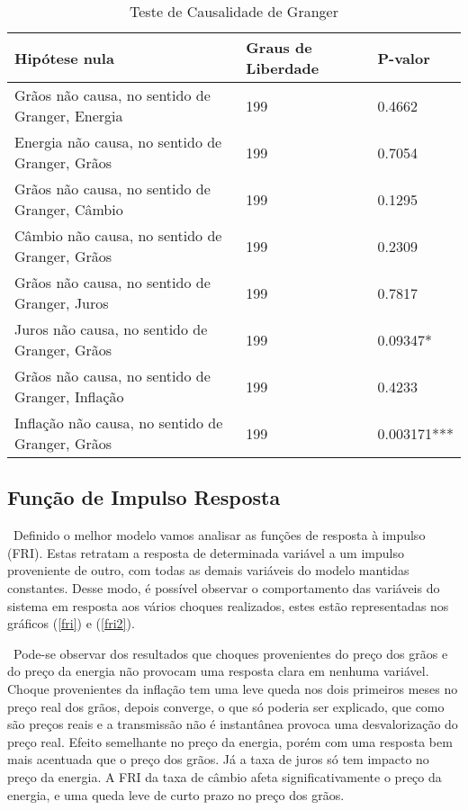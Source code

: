 \documentclass[a4paper,12pt,oneside,titlepage]{article}
\begin{document}
 
\begin{table}[H]
	\caption{Teste de Causalidade de Granger}
	\label{granger}
	\begin{center}
		\begin{tabular}{lll}
			\hline
			Hipótese nula& Graus de Liberdade& P-valor\\ 
			\hline
			Grãos não causa, no sentido de Granger, Energia& 199& 0.4662\\
			Energia não causa, no sentido de Granger, Grãos& 199& 0.7054\\
			Grãos não causa, no sentido de Granger, Câmbio& 199& 0.1295\\
			Câmbio não causa, no sentido de Granger, Grãos& 199& 0.2309\\
			Grãos não causa, no sentido de Granger, Juros& 199& 0.7817\\
			Juros não causa, no sentido de Granger, Grãos& 199& 0.09347*\\
			Grãos não causa, no sentido de Granger, Inflação& 199& 0.4233\\
			Inflação não causa, no sentido de Granger, Grãos& 199& 0.003171***\\
			\hline
		\end{tabular}
	\end{center}
\end{table}
 


  
\subsection{Função de Impulso Resposta}
 
\ Definido o melhor modelo vamos analisar as funções de resposta à impulso (FRI). Estas retratam a resposta de determinada variável a um impulso proveniente de outro, com
todas as demais variáveis do modelo mantidas constantes. Desse modo, é possível observar o comportamento das variáveis do sistema em resposta aos vários choques realizados, estes estão representadas nos gráficos (\ref{fri}) e (\ref{fri2}).

\ Pode-se observar dos resultados que choques provenientes do preço dos grãos e do preço da energia não provocam uma resposta clara em nenhuma variável. Choque provenientes da inflação tem uma leve queda nos dois primeiros meses no preço real dos grãos, depois converge, o que só poderia ser explicado, que como são preços reais e a transmissão não é instantânea provoca uma desvalorização do preço real. Efeito semelhante no preço da energia, porém com uma resposta bem mais acentuada que o preço dos grãos. Já a taxa de juros só tem impacto no preço da energia. A FRI da taxa de câmbio afeta significativamente o preço da energia, e uma queda leve de curto prazo no preço dos grãos.
\end{document}
